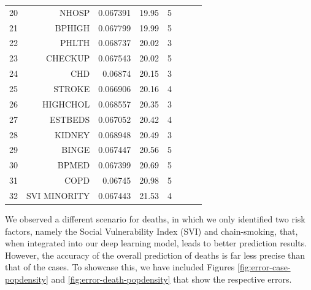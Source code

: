 \documentclass[a4paper, inpress]{jds} %
\renewcommand{\_}{%
    \textunderscore\hspace{0pt}%
}
\begin{document}
\begin{table}[!p]
\begin{tabular}{rrrrrlrl}
20	&	NHOSP	&	0.067391	&	19.95	&	5	 \\
21	&	BPHIGH	&	0.067799	&	19.99	&	5	 \\
22	&	PHLTH	&	0.068737	&	20.02	&	3	 \\
23	&	CHECKUP	&	0.067543	&	20.02	&	5	 \\
24	&	CHD	&	0.06874	&	20.15	&	3	 \\
25	&	STROKE	&	0.066906	&	20.16	&	4	 \\
26	&	HIGHCHOL	&	0.068557	&	20.35	&	3	 \\
27	&	ESTBEDS	&	0.067052	&	20.42	&	4	 \\
28	&	KIDNEY	&	0.068948	&	20.49	&	3	 \\
29	&	BINGE	&	0.067447	&	20.56	&	5	 \\
30	&	BPMED	&	0.067399	&	20.69	&	5	 \\
31	&	COPD	&	0.06745	&	20.98	&	5	 \\
32	&	SVI\_MINORITY	&	0.067443	&	21.53	&	4	 \\
\bottomrule
\end{tabular}
\end{table}

We observed a different scenario for deaths, in which we only
identified two risk factors, namely the Social Vulnerability Index
(SVI) and chain-smoking, that, when integrated into our deep learning
model, leads to better prediction results. However, the accuracy of
the overall prediction of deaths is far less precise than that of the
cases. To showcase this, we have included Figures
\ref{fig:error-case-popdensity} and \ref{fig:error-death-popdensity}
that show the respective errors.
\end{document}
